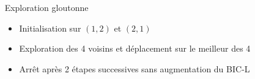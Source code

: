 \documentclass{beamer}
\begin{document}
\begin{frame}
\begin{columns}
\begin{column}{0.5\linewidth}
\begin{tikzpicture}
            \end{tikzpicture}
        \end{column}
        \begin{column}{0.5\linewidth}
            \begin{block}{Exploration gloutonne}
                \begin{itemize}
                    \item Initialisation sur $(1,2)$ et $(2,1)$
                    \item Exploration des 4 voisins et déplacement sur le meilleur des 4
                    \item Arrêt après 2 étapes successives sans augmentation du BIC-L
                \end{itemize}
            \end{block}
        \end{column}
    \end{columns}
\end{frame}
\end{document}
